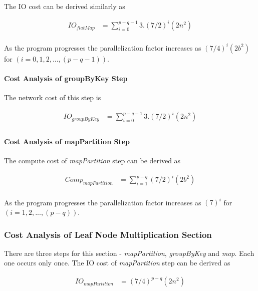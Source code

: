 The IO cost can be derived similarly as

\begin{equation}
    \begin{aligned}
        IO_{flatMap}&=\sum_{i=0}^{p-q-1}3.(7/2)^{i}(2n^{2}) \\        
    \end{aligned}
\end{equation}

As the program progresses the parallelization factor increases as $(7/4)^{i}(2b^{2})$ for $(i = 0, 1, 2, ..., (p-q-1))$.

\paragraph{Cost Analysis of groupByKey Step}
The network cost of this step is

\begin{equation}
    \begin{aligned}
        IO_{groupByKey}&=\sum_{i=0}^{p-q-1}3.(7/2)^{i}(2n^{2}) \\        
    \end{aligned}
\end{equation}

\paragraph{Cost Analysis of mapPartition Step}
The compute cost of \textit{mapPartition} step can be derived as

\begin{equation}
    \begin{aligned}
        Comp_{mapPartition}&=\sum_{i=1}^{p-q}(7/2)^{i}(2b^{2}) \\        
    \end{aligned}
\end{equation}

As the program progresses the parallelization factor increases as $(7)^{i}$ for $(i = 1, 2, ..., (p-q))$.

\subsubsection{Cost Analysis of Leaf Node Multiplication Section}
There are three steps for this section - \textit{mapPartition}, \textit{groupByKey} and \textit{map}. Each one occurs only once. The IO cost of \textit{mapPartition} step can be derived as

\begin{equation}
    \begin{aligned}
        IO_{mapPartition}&=(7/4)^{p-q}(2n^{2}) \\        
    \end{aligned}
\end{equation}


